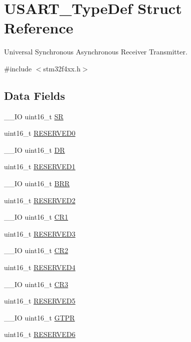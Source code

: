 \hypertarget{struct_u_s_a_r_t___type_def}{\section{U\-S\-A\-R\-T\-\_\-\-Type\-Def Struct Reference}
\label{struct_u_s_a_r_t___type_def}
}


Universal Synchronous Asynchronous Receiver Transmitter.  




{\ttfamily \#include $<$stm32f4xx.\-h$>$}

\subsection*{Data Fields}
\begin{DoxyCompactItemize}
\item 
\-\_\-\-\_\-\-I\-O uint16\-\_\-t \hyperlink{struct_u_s_a_r_t___type_def_a44962ea5442d203bf4954035d1bfeb9d}{S\-R}
\item 
uint16\-\_\-t \hyperlink{struct_u_s_a_r_t___type_def_a149feba01f9c4a49570c6d88619f504f}{R\-E\-S\-E\-R\-V\-E\-D0}
\item 
\-\_\-\-\_\-\-I\-O uint16\-\_\-t \hyperlink{struct_u_s_a_r_t___type_def_a0a1acc0425516ff7969709d118b96a3b}{D\-R}
\item 
uint16\-\_\-t \hyperlink{struct_u_s_a_r_t___type_def_a8249a3955aace28d92109b391311eb30}{R\-E\-S\-E\-R\-V\-E\-D1}
\item 
\-\_\-\-\_\-\-I\-O uint16\-\_\-t \hyperlink{struct_u_s_a_r_t___type_def_af0ba3d82d524fddbe0fb3309788e2954}{B\-R\-R}
\item 
uint16\-\_\-t \hyperlink{struct_u_s_a_r_t___type_def_a5573848497a716a9947fd87487709feb}{R\-E\-S\-E\-R\-V\-E\-D2}
\item 
\-\_\-\-\_\-\-I\-O uint16\-\_\-t \hyperlink{struct_u_s_a_r_t___type_def_a61400ce239355b62aa25c95fcc18a5e1}{C\-R1}
\item 
uint16\-\_\-t \hyperlink{struct_u_s_a_r_t___type_def_a6c3b31022e6f59b800e9f5cc2a89d54c}{R\-E\-S\-E\-R\-V\-E\-D3}
\item 
\-\_\-\-\_\-\-I\-O uint16\-\_\-t \hyperlink{struct_u_s_a_r_t___type_def_a2a3e81bd118d1bc52d24a0b0772e6a0c}{C\-R2}
\item 
uint16\-\_\-t \hyperlink{struct_u_s_a_r_t___type_def_aa0223808025f5bf9c056185038c9d545}{R\-E\-S\-E\-R\-V\-E\-D4}
\item 
\-\_\-\-\_\-\-I\-O uint16\-\_\-t \hyperlink{struct_u_s_a_r_t___type_def_a9651ce2df8eec57b9cab2f27f6dbf3e1}{C\-R3}
\item 
uint16\-\_\-t \hyperlink{struct_u_s_a_r_t___type_def_abd36010ac282682d1f3c641b183b1b6f}{R\-E\-S\-E\-R\-V\-E\-D5}
\item 
\-\_\-\-\_\-\-I\-O uint16\-\_\-t \hyperlink{struct_u_s_a_r_t___type_def_a26f8b74978e03c8a4c99c9395a6a524d}{G\-T\-P\-R}
\item 
uint16\-\_\-t \hyperlink{struct_u_s_a_r_t___type_def_aab502dde158ab7da8e7823d1f8a06edb}{R\-E\-S\-E\-R\-V\-E\-D6}
\end{DoxyCompactItemize}


